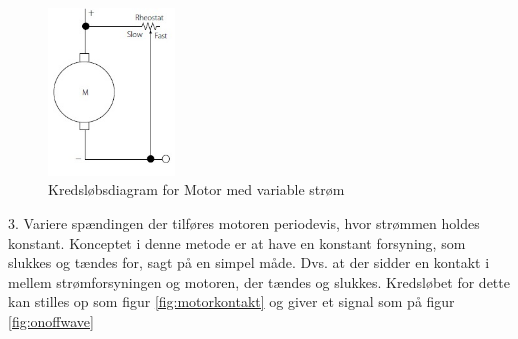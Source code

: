 \begin{figure}[H]
	\centering
	\includegraphics[width=0.3\textwidth]{billeder/Hardware/motorcurrent.jpg}
	\caption{Kredsløbsdiagram for Motor med variable strøm}
	\label{fig:motorcurrent}
\end{figure}



3. Variere spændingen der tilføres motoren periodevis, hvor strømmen holdes konstant.
Konceptet i denne metode er at have en konstant forsyning, som slukkes og tændes for, sagt på en simpel måde. Dvs. at der sidder en kontakt i mellem strømforsyningen og motoren, der tændes og slukkes. Kredsløbet for dette kan stilles op som figur \ref{fig:motorkontakt} og giver et signal som på figur \ref{fig:onoffwave}

